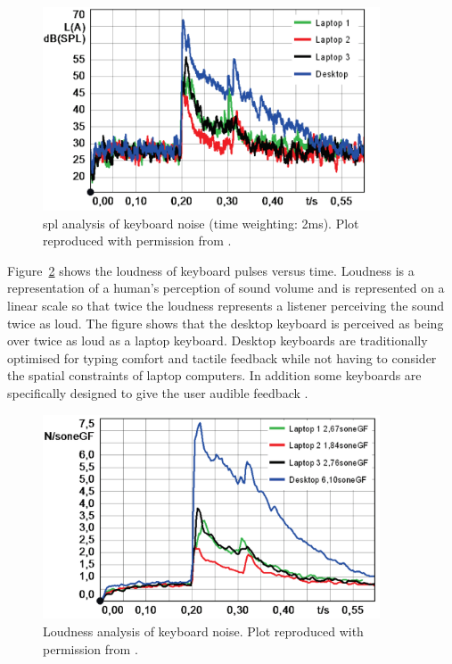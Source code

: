 \begin{figure}[!] %
\centering
\includegraphics[width=100mm]{TypingSPLKeyboards.png}
\caption{\gls{spl} analysis of keyboard noise (time weighting: 2ms). Plot reproduced with permission from \cite{Hauswirth2013}.}\label{fig:TypingSPLKeyboards}
\end{figure}

Figure~\ref{fig:TypingLoudnessKeyboards} shows the loudness of keyboard pulses versus time. Loudness is a representation of a human's perception of sound volume and is represented on a linear scale so that twice the loudness represents a listener perceiving the sound twice as loud. The figure shows that the desktop keyboard is perceived as being over twice as loud as a laptop keyboard. Desktop keyboards are traditionally optimised for typing comfort and tactile feedback while not having to consider the spatial constraints of laptop computers. In addition some keyboards are specifically designed to give the user audible feedback \cite{Hauswirth2013}.

\begin{figure}[!] %
\centering
\includegraphics[width=100mm]{TypingLoudnessKeyboards.png}
\caption{Loudness analysis of keyboard noise. Plot reproduced with permission from \cite{Hauswirth2013}.}\label{fig:TypingLoudnessKeyboards}
\end{figure}

